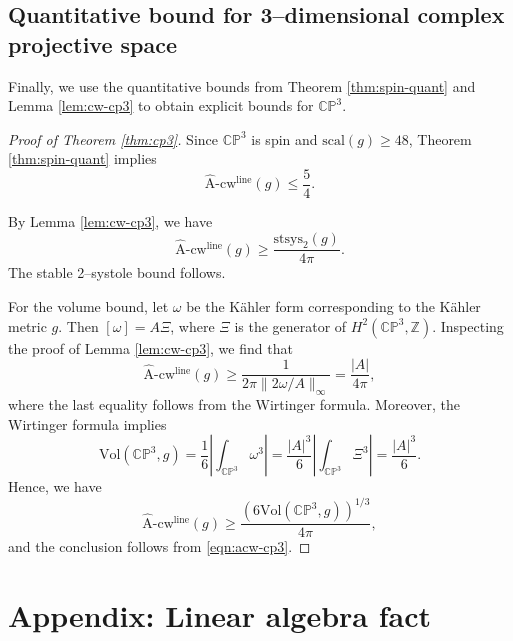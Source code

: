 \documentclass[12pt]{amsart}
\theoremstyle{definition}
\numberwithin{equation}{section}
\newcommand{\Z}{\mathbb{Z}}
\newcommand{\CP}{\mathbb{C}\mathbb{P}}
\newcommand{\acw}{\hat{\mathrm{A}}\text{-}\mathrm{cw}}
\begin{document}
\subsection{Quantitative bound for 3--dimensional complex projective space}
Finally, we use the quantitative bounds from Theorem \ref{thm:spin-quant} and Lemma \ref{lem:cw-cp3} to obtain explicit bounds for $\CP^3$.

\begin{proof}[Proof of Theorem \ref{thm:cp3}]
Since $\CP^3$ is spin and $\mathrm{scal}(g) \geq 48$, Theorem \ref{thm:spin-quant} implies
\begin{equation}\label{eqn:acw-cp3} \acw^{\mathrm{line}}(g) \leq \frac{5}{4}. \end{equation}

By Lemma \ref{lem:cw-cp3}, we have
\[ \acw^{\mathrm{line}}(g) \geq \frac{\mathrm{stsys}_2(g)}{4\pi}. \]
The stable 2--systole bound follows.

For the volume bound, let $\omega$ be the K{\"a}hler form corresponding to the K{\"a}hler metric $g$. Then $[\omega] = A\Xi$, where $\Xi$ is the generator of $H^2(\CP^3, \Z)$. Inspecting the proof of Lemma \ref{lem:cw-cp3}, we find that
\[ \acw^{\mathrm{line}}(g) \geq \frac{1}{2\pi\|2\omega/A\|_{\infty}} = \frac{|A|}{4\pi}, \]
where the last equality follows from the Wirtinger formula. Moreover, the Wirtinger formula implies
\[ \mathrm{Vol}(\CP^3, g) = \frac{1}{6}\left|\int_{\CP^3} \omega^3 \right| = \frac{|A|^3}{6}\left|\int_{\CP^3} \Xi^3\right| = \frac{|A|^3}{6}. \]
Hence, we have
\[ \acw^{\mathrm{line}}(g) \geq \frac{(6\mathrm{Vol}(\CP^3, g))^{1/3}}{4\pi}, \]
and the conclusion follows from \eqref{eqn:acw-cp3}.
\end{proof}







\section{Appendix: Linear algebra fact}
\end{document}
